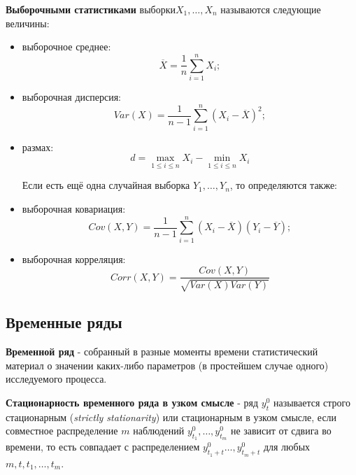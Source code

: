 \documentclass{article}
\begin{document}
      \textbf{Выборочными статистиками} $выборки X_1, \ldots, X_n$ называются следующие величины:
      \begin{itemize}
          \item выборочное среднее:
          \begin{equation}
              \overline{X} = \frac{1}{n}\sum\limits_{i=1}^n X_i;
          \end{equation}{}
          \item выборочная дисперсия: 
          \begin{equation}
              Var(X) = \frac{1}{n-1}\sum\limits_{i=1}^n (X_i - \overline{X})^2;
          \end{equation}{}
          \item размах:
          \begin{equation}
              d = \max_{1\leq i \leq n} {X_i} - \min_{1\leq i \leq n} {X_i}
          \end{equation}{}\par
          Если есть ещё одна случайная выборка $Y_1,\ldots,Y_n$, то определяются также:
          \item выборочная ковариация:
          \begin{equation}
              Cov(X,Y) = \frac{1}{n-1} \sum\limits_{i=1}^n (X_i - \overline{X})(Y_i - \overline{Y});
          \end{equation}{}
          \item выборочная корреляция:
          \begin{equation}
              Corr(X,Y) = \frac{Cov(X,Y)}{\sqrt{Var(X)Var(Y)}}
          \end{equation}{}
      \end{itemize}
      
  
  \subsection{Временные ряды}
  
  \textbf{Временной ряд} - собранный в разные моменты времени статистический материал о значении каких-либо параметров (в простейшем случае одного) исследуемого процесса.\par
  
  \textbf{Стационарность временного ряда в узком смысле} - ряд $y_t^0$ называется строго стационарным (\textsl{strictly stationarity}) или стационарным в узком смысле, если совместное распределение $m$ наблюдений $y_{t_1}^0, \ldots, y_{t_m}^0$ не зависит от сдвига во времени, то есть совпадает с распределением $y_{t_1+t}^0 \ldots, y_{t_m+t}^0$ для любых $m, t, t_1, \ldots, t_m$.\par
  
\end{document}
